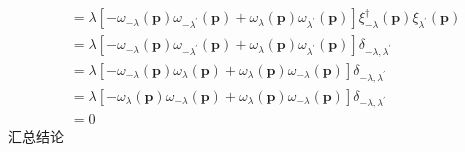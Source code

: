 \begin{equation}
\begin{aligned}
\\
&=\lambda \left[ -\omega _{-\lambda}\left( \mathbf{p} \right) \omega _{-\lambda ^{\prime}}\left( \mathbf{p} \right) +\omega _{\lambda}\left( \mathbf{p} \right) \omega _{\lambda ^{\prime}}\left( \mathbf{p} \right) \right] \xi _{-\lambda}^{\dagger}\left( \mathbf{p} \right) \xi _{\lambda ^{\prime}}\left( \mathbf{p} \right) 
\\
&=\lambda \left[ -\omega _{-\lambda}\left( \mathbf{p} \right) \omega _{-\lambda ^{\prime}}\left( \mathbf{p} \right) +\omega _{\lambda}\left( \mathbf{p} \right) \omega _{\lambda ^{\prime}}\left( \mathbf{p} \right) \right] \delta _{-\lambda ,\lambda ^{\prime}}
\\
&=\lambda \left[ -\omega _{-\lambda}\left( \mathbf{p} \right) \omega _{\lambda}\left( \mathbf{p} \right) +\omega _{\lambda}\left( \mathbf{p} \right) \omega _{-\lambda}\left( \mathbf{p} \right) \right] \delta _{-\lambda ,\lambda ^{\prime}}
\\
&=\lambda \left[ -\omega _{\lambda}\left( \mathbf{p} \right) \omega _{-\lambda}\left( \mathbf{p} \right) +\omega _{\lambda}\left( \mathbf{p} \right) \omega _{-\lambda}\left( \mathbf{p} \right) \right] \delta _{-\lambda ,\lambda ^{\prime}}
\\
&=0
    \end{aligned}
\end{equation}
汇总结论




